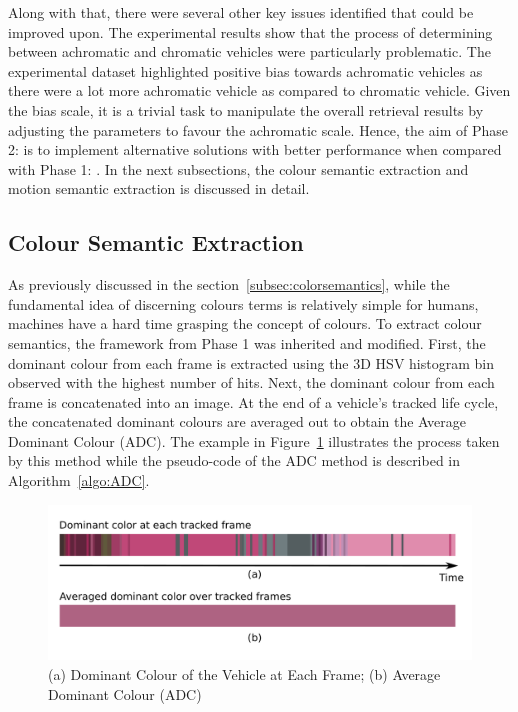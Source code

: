 Along with that, there were several other key issues identified that could be improved upon.
The experimental results show that the process of determining between achromatic and chromatic vehicles were particularly problematic.
The experimental dataset highlighted positive bias towards achromatic vehicles as there were a lot more achromatic vehicle as compared to chromatic vehicle.
Given the bias scale, it is a trivial task to manipulate the overall retrieval results by adjusting the parameters to favour the achromatic scale.
Hence, the aim of Phase 2: \versionTwoExt is to implement alternative solutions with better performance when compared with Phase 1: \versionOneExt. In the next subsections, the colour semantic extraction and motion semantic extraction is discussed in detail.


\subsection{Colour Semantic Extraction}
\label{section:versiontwoColor}
As previously discussed in the section~\ref{subsec:colorsemantics}, while the fundamental idea of discerning colours terms is relatively simple for humans, machines have a hard time grasping the concept of colours. To extract colour semantics, the framework from Phase 1 was inherited and modified.
First, the dominant colour from each frame is extracted using the 3D HSV histogram bin observed with the highest number of hits. Next, the dominant colour from each frame is concatenated into an image. At the end of a vehicle's tracked life cycle, the concatenated dominant colours are averaged out to obtain the Average Dominant Colour (ADC). The example in Figure~\ref{fig:ADC} illustrates the process taken by this method while the pseudo-code of the ADC method is described in Algorithm~\ref{algo:ADC}.

\begin{figure}[hbt!]\centering
\includegraphics[width=.9\textwidth]{image/general/ADC.png}
\caption{(a) Dominant Colour of the Vehicle at Each Frame; (b) Average Dominant Colour (ADC)}
\label{fig:ADC}
\end{figure}


